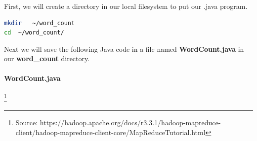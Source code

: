 \documentclass[12pt,english]{book}
\begin{document}
First, we will create a directory in our local filesystem to put our .java program.

\begin{lstlisting}[language=bash, frame=single, basicstyle=\footnotesize]
mkdir   ~/word_count
cd  ~/word_count/
\end{lstlisting}

Next we will save the following Java code in a file named \textbf{WordCount.java} in our \textbf{word\_count} directory.

\paragraph{WordCount.java} \footnote{Source: https://hadoop.apache.org/docs/r3.3.1/hadoop-mapreduce-client/hadoop-mapreduce-client-core/MapReduceTutorial.html}
\end{document}
